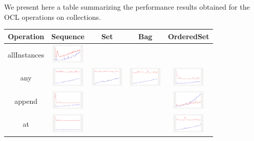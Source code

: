We present here a table summarizing the performance results obtained for the OCL
operations on collections.

\newpage
\begin{longtable}{ c|c c c c}
  \textbf{Operation} & \textbf{Sequence} & \textbf{Set} & \textbf{Bag} & \textbf{OrderedSet} \\\hline
  allInstances & \includegraphics[width=1.6cm]{graphs/AllInstances} & & &
  \\\hline  

any
&
\includegraphics[width=1.6cm]{graphs/sequence/small/Any} 
&
\includegraphics[width=1.6cm]{graphs/set/small/Any}
& 
\includegraphics[width=1.6cm]{graphs/bag/small/Any}
& 
\includegraphics[width=1.6cm]{graphs/orderedset/small/Any}
\\\hline
  
append
& 
\includegraphics[width=1.6cm]{graphs/sequence/small/Append}
&
&
& 
\includegraphics[width=1.6cm]{graphs/orderedset/small/Append}
\\\hline
  
at
& 
\includegraphics[width=1.6cm]{graphs/sequence/small/At}
&
&
& 
\includegraphics[width=1.6cm]{graphs/orderedset/small/At}
\\\hline


\end{longtable}
